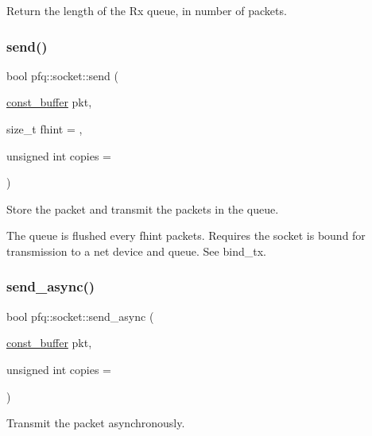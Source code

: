 Return the length of the Rx queue, in number of packets. 

\mbox{\label{classpfq_1_1socket_a2d80378cecae811bedc0ae8ff9412e62}} 
\subsubsection{\texorpdfstring{send()}{send()}}
{\footnotesize\ttfamily bool pfq\+::socket\+::send (\begin{DoxyParamCaption}\item[{\hyperlink{namespacepfq_ac835a1bd09b4cbaba61c100b50d0a99f}{const\+\_\+buffer}}]{pkt,  }\item[{size\+\_\+t}]{fhint = {},  }\item[{unsigned int}]{copies = {} }\end{DoxyParamCaption})\hspace{0.3cm}{\ttfamily [inline]}}



Store the packet and transmit the packets in the queue. 

The queue is flushed every fhint packets. Requires the socket is bound for transmission to a net device and queue. See \textquotesingle{}bind\+\_\+tx\textquotesingle{}. \mbox{\label{classpfq_1_1socket_a16f84967f992ee861e5f18d5e29a3275}} 
\subsubsection{\texorpdfstring{send\+\_\+async()}{send\_async()}}
{\footnotesize\ttfamily bool pfq\+::socket\+::send\+\_\+async (\begin{DoxyParamCaption}\item[{\hyperlink{namespacepfq_ac835a1bd09b4cbaba61c100b50d0a99f}{const\+\_\+buffer}}]{pkt,  }\item[{unsigned int}]{copies = {} }\end{DoxyParamCaption})\hspace{0.3cm}{\ttfamily [inline]}}



Transmit the packet asynchronously. 

